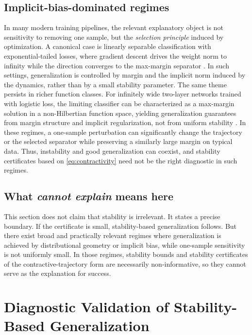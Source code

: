 \documentclass{article}
\numberwithin{equation}{section}
\begin{document}
\subsection{Implicit-bias-dominated regimes}
\label{subsec:implicit-bias}

In many modern training pipelines, the relevant explanatory object is not sensitivity to removing one sample, but the \emph{selection principle} induced by optimization. A canonical case is linearly separable classification with exponential-tailed losses, where gradient descent drives the weight norm to infinity while the direction converges to the max-margin separator \cite{SoudryHofferSrebro2018}. In such settings, generalization is controlled by margin and the implicit norm induced by the dynamics, rather than by a small stability parameter. The same theme persists in richer function classes. For infinitely wide two-layer networks trained with logistic loss, the limiting classifier can be characterized as a max-margin solution in a non-Hilbertian function space, yielding generalization guarantees from margin structure and implicit regularization, not from uniform stability \cite{ChizatBach2020}. In these regimes, a one-sample perturbation can significantly change the trajectory or the selected separator while preserving a similarly large margin on typical data. Thus, instability and good generalization can coexist, and stability certificates based on \eqref{eq:contractivity} need not be the right diagnostic in such regimes.

\subsection{What \emph{cannot explain} means here}
\label{subsec:meaning}

This section does not claim that stability is irrelevant. It states a precise boundary. If the certificate is small, stability-based generalization follows. But there exist broad and practically relevant regimes where generalization is achieved by distributional geometry or implicit bias, while one-sample sensitivity is not uniformly small. In those regimes, stability bounds and stability certificates of the contractive-trajectory form are necessarily non-informative, so they cannot serve as the explanation for success.

\section{Diagnostic Validation of Stability-Based Generalization}
\label{sec:diagnostics}
\end{document}
